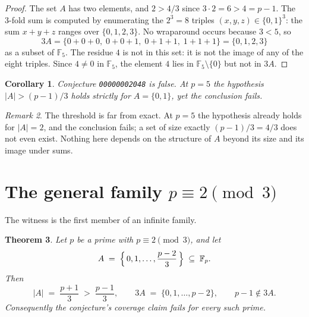 \documentclass[11pt]{article}
\newtheorem{theorem}{Theorem}
\newtheorem{corollary}[theorem]{Corollary}
\theoremstyle{definition}
\theoremstyle{remark}
\newtheorem{remark}[theorem]{Remark}
\newcommand{\F}{\mathbb{F}}
\begin{document}
\begin{proof}
The set $A$ has two elements, and $2 > 4/3$ since $3 \cdot 2 = 6 > 4 = p-1$.
The 3-fold sum is computed by enumerating the $2^3 = 8$ triples
$(x,y,z) \in \{0,1\}^3$: the sum $x+y+z$ ranges over $\{0,1,2,3\}$. No
wraparound occurs because $3 < 5$, so
\[
3A = \{0+0+0,\; 0+0+1,\; 0+1+1,\; 1+1+1\} = \{0,1,2,3\}
\]
as a subset of $\F_5$. The residue $4$ is not in this set: it is not the image
of any of the eight triples. Since $4 \ne 0$ in $\F_5$, the element $4$ lies in
$\F_5 \setminus \{0\}$ but not in $3A$.
\end{proof}

\begin{corollary}
Conjecture \texttt{00000002048} is false. At $p = 5$ the hypothesis
$|A| > (p-1)/3$ holds strictly for $A = \{0,1\}$, yet the conclusion fails.
\end{corollary}

\begin{remark}
The threshold is far from exact. At $p = 5$ the hypothesis already holds for
$|A| = 2$, and the conclusion fails; a set of size exactly $(p-1)/3 = 4/3$ does
not even exist. Nothing here depends on the structure of $A$ beyond its size
and its image under sums.
\end{remark}

\section{The general family $p \equiv 2 \pmod 3$}

The witness is the first member of an infinite family.

\begin{theorem}\label{thm:family}
Let $p$ be a prime with $p \equiv 2 \pmod 3$, and let
\[
A \;=\; \Bigl\{\,0, 1, \dots, \frac{p-2}{3}\,\Bigr\} \;\subseteq\; \F_p .
\]
Then
\[
|A| \;=\; \frac{p+1}{3} \;>\; \frac{p-1}{3},
\qquad
3A \;=\; \{0, 1, \dots, p-2\},
\qquad
p - 1 \notin 3A .
\]
Consequently the conjecture's coverage claim fails for every such prime.
\end{theorem}
\end{document}
